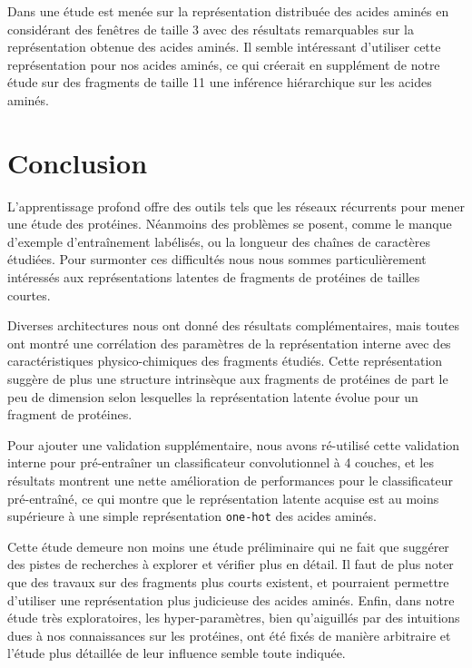 \documentclass[a4paper, 11pt, onecolumn]{article}
\begin{document}
Dans \cite{asgari2015continuous} une étude est menée sur la représentation distribuée
des acides aminés en considérant des fenêtres de taille 3 avec des résultats
remarquables sur la représentation obtenue des acides aminés. Il semble
intéressant d'utiliser cette représentation pour nos acides aminés, ce qui
créerait en supplément de notre étude sur des fragments de taille 11 une
inférence hiérarchique sur les acides aminés.

\section*{Conclusion}

L'apprentissage profond offre des outils tels que les réseaux récurrents pour
mener une étude des protéines. Néanmoins des problèmes se posent, comme le
manque d'exemple d'entraînement labélisés, ou la longueur des chaînes de
caractères étudiées. Pour surmonter ces difficultés nous nous
sommes particulièrement intéressés aux représentations latentes de fragments de
protéines de tailles courtes. 

Diverses architectures nous ont donné des
résultats complémentaires, mais toutes ont montré une corrélation des paramètres
de la représentation interne avec des caractéristiques physico-chimiques des
fragments étudiés. Cette représentation suggère de plus une structure
intrinsèque aux fragments de protéines de part le peu de dimension selon
lesquelles la représentation latente évolue pour un fragment de protéines.

Pour ajouter une validation supplémentaire, nous avons ré-utilisé cette
validation interne pour pré-entraîner un classificateur convolutionnel à 4
couches, et les résultats montrent une nette amélioration de performances pour
le classificateur pré-entraîné, ce qui montre que le représentation latente
acquise est au moins supérieure à une simple représentation \texttt{one-hot} des
acides aminés.

Cette étude demeure non moins une étude préliminaire qui ne fait que suggérer
des pistes de recherches à explorer et vérifier plus en détail. Il faut de plus
noter que des travaux sur des fragments plus courts existent, et pourraient
permettre d'utiliser une représentation plus judicieuse des acides aminés.
Enfin, dans notre étude très exploratoires, les hyper-paramètres, bien
qu'aiguillés par des intuitions dues à nos connaissances sur les protéines, ont
été fixés de manière arbitraire et l'étude plus détaillée de leur influence semble toute indiquée.
\end{document}
